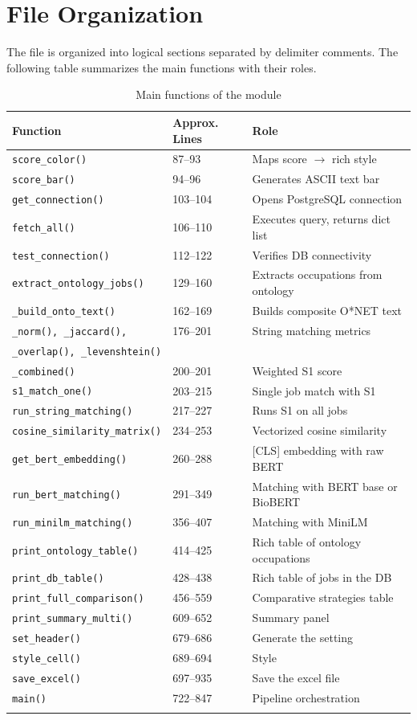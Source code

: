 \documentclass[12pt, a4paper]{report}
\begin{document}
\section{File Organization}

The file is organized into logical sections separated by delimiter
comments. The following table summarizes the main functions with
their roles.

\begin{longtable}{p{5.5cm} p{2.5cm} p{6cm}}
\toprule
\textbf{Function} & \textbf{Approx. Lines} & \textbf{Role} \\
\midrule
\endhead
\texttt{score\_color()} & 87--93 & Maps score $\to$ rich style \\
\texttt{score\_bar()} & 94--96 & Generates ASCII text bar \\
\texttt{get\_connection()} & 103--104 & Opens PostgreSQL connection \\
\texttt{fetch\_all()} & 106--110 & Executes query, returns dict list \\
\texttt{test\_connection()} & 112--122 & Verifies DB connectivity \\
\texttt{extract\_ontology\_jobs()} & 129--160 & Extracts occupations from ontology \\
\texttt{\_build\_onto\_text()} & 162--169 & Builds composite O*NET text \\
\texttt{\_norm(), \_jaccard(),} & 176--201 & String matching metrics \\
\texttt{\_overlap(), \_levenshtein()} & & \\
\texttt{\_combined()} & 200--201 & Weighted S1 score \\
\texttt{s1\_match\_one()} & 203--215 & Single job match with S1 \\
\texttt{run\_string\_matching()} & 217--227 & Runs S1 on all jobs \\
\texttt{cosine\_similarity\_matrix()} & 234--253 & Vectorized cosine similarity \\
\texttt{get\_bert\_embedding()} & 260--288 & [CLS] embedding with raw BERT \\
\texttt{run\_bert\_matching()} & 291--349 & Matching with BERT base or BioBERT \\
\texttt{run\_minilm\_matching()} & 356--407 & Matching with MiniLM \\
\texttt{print\_ontology\_table()} & 414--425 & Rich table of ontology occupations \\
\texttt{print\_db\_table()} & 428--438 & Rich table of jobs in the DB \\
\texttt{print\_full\_comparison()} & 456--559 & Comparative strategies table \\
\texttt{print\_summary\_multi()} & 609--652 & Summary panel \\
\texttt{set\_header()} & 679--686 & Generate the setting \\
\texttt{style\_cell()} & 689--694 & Style \\
\texttt{save\_excel()} & 697--935 & Save the excel file \\
\texttt{main()} & 722--847 & Pipeline orchestration \\
\bottomrule
\caption{Main functions of the module}
\end{longtable}
\end{document}
